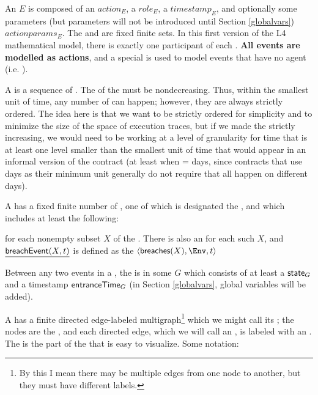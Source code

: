 \documentclass[12pt]{article}
\begin{document}
An  $E$ is composed of an  $action_E$, a  $role_E$, a \TimeStamp $timestamp_E$, and optionally some parameters (but parameters will not be introduced until Section \ref{globalvars}) $actionparams_E$. The \Actions and \Roles are fixed finite sets. In this first version of the L4 mathematical model, there is exactly one participant of each \Role.
{\bf All events are modelled as actions}, and a special \Role {}  is used to model events that have no agent (i.e. \Role).

A  is a sequence of \Events. The \TimeStamps of the \Events must be nondecreasing. Thus, within the smallest unit of time, any number of \Events can happen; however, they are always strictly ordered. The idea here is that we want \Events to be strictly ordered for simplicity and to minimize the size of the space of execution traces, but if we made the \TimeStamps strictly increasing, we would need to be working at a level of granularity for time that is at least one level smaller than the smallest unit of time that would appear in an informal version of the contract (at least when \TimeUnit = days, since contracts that use days as their minimum unit generally do not require that all \Events happen on different days).

A \Contract has a fixed finite number of , one of which is designated the , and which includes at least the following:
\begin{LPPI}
\item {}
\item {} for each nonempty subset $X$ of the \Roles. There is also an \Action {} for each such $X$, and $\underline{\textsf{breachEvent}(X,t)}$ is defined as the \Event $\tup{\breaches{X}, \Env, t}$
\end{LPPI}
Between any two events in a \trace, the \Contract is in some  $G$ which consists of at least a \State $\textsf{state}_{G}$ and a timestamp $\textsf{entranceTime}_{G}$ (in Section \ref{globalvars}, global variables will be added).

\medskip

A \Contract has a finite directed edge-labeled multigraph\footnote{By this I mean there may be multiple edges from one node to another, but they must have different labels.} which we might call its ; the nodes are the \States, and each directed edge, which we will call an , is labeled with an \Action. The \skeleton is the part of the \Contract that is easy to visualize. Some notation:
\end{document}
